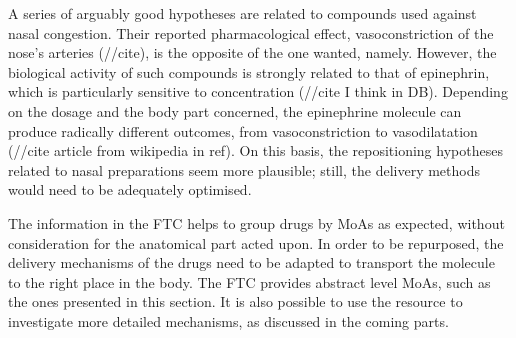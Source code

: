A series of arguably good hypotheses are related to compounds used against nasal congestion. Their reported pharmacological effect, vasoconstriction of the nose’s arteries (//cite), is the opposite of the one wanted, namely. However, the biological activity of such compounds is strongly related to that of epinephrin, which is particularly sensitive to concentration (//cite I think in DB). Depending on the dosage and the body part concerned, the epinephrine molecule can produce radically different outcomes, from vasoconstriction to vasodilatation (//cite article from wikipedia in ref). On this basis, the repositioning hypotheses related to nasal preparations seem more plausible; still, the delivery methods would need to be adequately optimised.

The information in the FTC helps to group drugs by MoAs as expected, without consideration for the anatomical part acted upon. In order to be repurposed, the delivery mechanisms of the drugs need to be adapted to transport the molecule to the right place in the body. The FTC provides abstract level MoAs, such as the ones presented in this section. It is also possible to use the resource to investigate more detailed mechanisms, as discussed in the coming parts.


